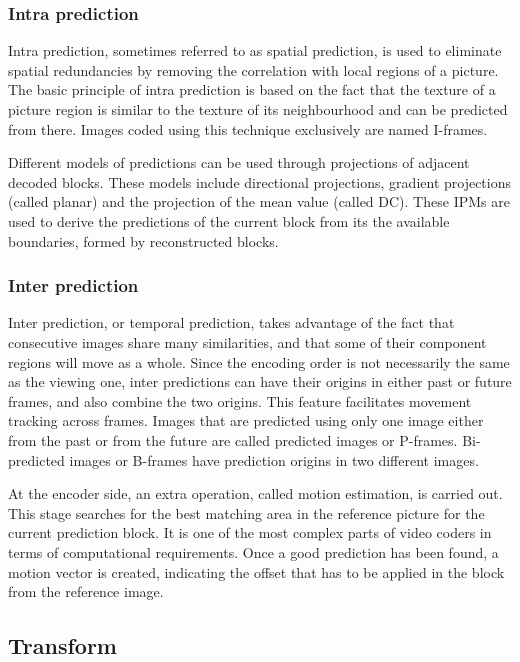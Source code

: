 \documentclass[11pt,a4paper,openright,twoside]{book}
\numberwithin{equation}{section} %
\numberwithin{figure}{section} %
\numberwithin{table}{section} %
\begin{document}
\subsubsection{Intra prediction}
\label{ssub:intra_prediction}

Intra prediction, sometimes referred to as spatial prediction, is used to
eliminate spatial redundancies by removing the correlation with local regions
of a picture.
The basic principle of intra prediction is based on the fact that the texture
of a picture region is similar to the texture of its neighbourhood and can be
predicted from there.
Images coded using this technique exclusively are named I-frames.

Different models of predictions can be used through projections of adjacent
decoded blocks.
These models include directional projections, gradient projections (called
planar) and the projection of the mean value (called DC).
These \acp{IPM} are used to derive the predictions of the current block from
its the available boundaries, formed by reconstructed blocks.

\subsubsection{Inter prediction}
\label{ssub:inter_prediction}

Inter prediction, or temporal prediction, takes advantage of the fact that
consecutive images share many similarities, and that some of their component
regions will move as a whole.
Since the encoding order is not necessarily the same as the viewing one, inter
predictions can have their origins in either past or future frames, and also
combine the two origins.
This feature facilitates movement tracking across frames.
Images that are predicted using only one image either from the past or from
the future are called predicted images or P-frames.
Bi-predicted images or B-frames have prediction origins in two different
images.

At the encoder side, an extra operation, called motion estimation, is
carried out.
This stage searches for the best matching area in the reference picture
for the current prediction block.
It is one of the most complex parts of video coders in terms of computational
requirements.
Once a good prediction has been found, a motion vector is created, indicating
the offset that has to be applied in the block from the reference image.

\subsection{Transform}
\label{sub:transform}
\end{document}
